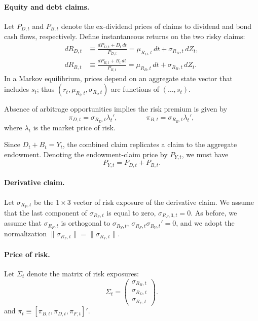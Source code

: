 \documentclass[11pt,english]{article}
\begin{document}
\paragraph{Equity and debt claims.} Let $P_{D,t}$ and $P_{B,t}$ denote the ex-dividend prices of claims to dividend and bond cash flows, respectively. Define instantaneous returns on the two risky claims:
\begin{align}
    dR_{D,t} &\equiv \frac{dP_{D,t}+D_t\,dt}{P_{D,t}}
    = \mu_{R_D,t}\,dt+\sigma_{R_D,t}\,dZ_t, \label{eq:RD_def}\\
    dR_{B,t} &\equiv \frac{dP_{B,t}+B_t\,dt}{P_{B,t}}
    = \mu_{R_B,t}\,dt+\sigma_{R_B,t}\,dZ_t. \label{eq:RB_def}
\end{align}
In a Markov equilibrium, prices depend on an aggregate state vector that includes $s_t$; thus $(r_t,\mu_{R_i,t},\sigma_{R_i,t})$ are functions of $(\ldots,s_t)$.

Absence of arbitrage opportunities implies the risk premium is given by
\begin{equation}
    \pi_{D,t} = \sigma_{R_D,t} \lambda_t', \qquad \qquad 
	\pi_{B,t} = \sigma_{R_B,t} \lambda_t',
\end{equation}
where $\lambda_t$ is the market price of risk.

Since $D_t+B_t=Y_t$, the combined claim replicates a claim to the aggregate endowment. Denoting the endowment-claim price by $P_{Y,t}$, we must have
\begin{equation}\label{eq:replication_prices}
    P_{Y,t}=P_{D,t}+P_{B,t}.
\end{equation}

\paragraph{Derivative claim.}
Let $\sigma_{R_F,t}$ be the $1\times 3$ vector of risk exposure of the derivative claim. 
We assume that the last component of $\sigma_{R_F,t}$ is equal to zero, $\sigma_{R_F,3,t} = 0$. 
As before, we assume that $\sigma_{R_F,t}$ is orthogonal to $\sigma_{R_Y,t}$, $\sigma_{R_F,t} \sigma_{R_Y,t}' = 0$, and we adopt the normalization $\|\sigma_{R_F,t} \| = \|\sigma_{R_Y,t} \|$.

\paragraph{Price of risk.} Let $\Sigma_t$ denote the matrix of risk exposures:
\begin{equation}
    \Sigma_t = \begin{pmatrix}
        \sigma_{R_B,t} \\
		\sigma_{R_D,t} \\
		 \sigma_{R_F,t}
    \end{pmatrix}.
\end{equation}
and $\pi_t \equiv [\pi_{B,t}, \pi_{D,t}, \pi_{F,t} ]'$.
\end{document}
